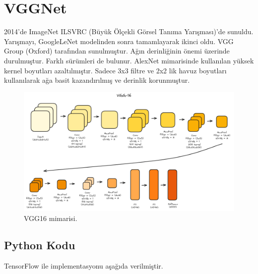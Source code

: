\section{VGGNet}
2014'de ImageNet ILSVRC (Büyük Ölçekli Görsel Tanıma Yarışması)'de sunuldu. Yarışmayı, GoogleLeNet modelinden sonra tamamlayarak ikinci oldu. VGG Group (Oxford) tarafından sunulmuştur. Ağın derinliğinin önemi üzerinde durulmuştur. Farklı sürümleri de bulunur. AlexNet mimarisinde kullanılan yüksek kernel boyutları azaltılmıştır. Sadece 3x3 filtre ve 2x2 lik havuz boyutları kullanılarak ağa basit kazandırılmış ve derinlik korunmuştur.

\begin{figure}[h]
    \centering
    \includegraphics[width=1\textwidth]{images/vgg16.png}
    \caption{VGG16 mimarisi.}
    \label{fig:enter-label}
\end{figure}

\subsection{Python Kodu}

TensorFlow ile implementasyonu aşağıda verilmiştir.


